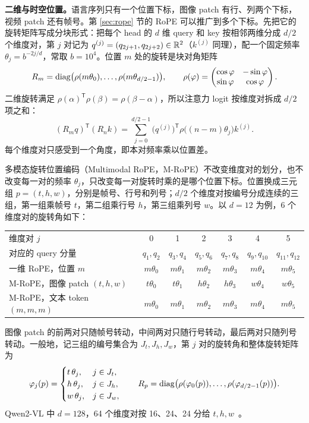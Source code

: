 \textbf{二维与时空位置。}语言序列只有一个位置下标，图像 patch 有行、列两个下标，视频 patch 还有帧号。第 \ref{sec:rope} 节的 RoPE 可以推广到多个下标。先把它的旋转矩阵写成分块形式：把每个 head 的 \(d\) 维 query 和 key 按相邻两维分成 \(d/2\) 个维度对，第 \(j\) 对记为 \(q^{(j)}=(q_{2j+1},q_{2j+2})\in\mathbb{R}^2\)（\(k^{(j)}\) 同理），配一个固定频率 \(\theta_j=b^{-2j/d}\)，常取 \(b=10^4\)。位置 \(m\) 处的旋转是块对角矩阵
\begin{equation}
 R_m=\operatorname{diag}\bigl(\rho(m\theta_0),\ldots,\rho(m\theta_{d/2-1})\bigr),
 \qquad
 \rho(\varphi)=\begin{pmatrix}\cos\varphi&-\sin\varphi\\ \sin\varphi&\cos\varphi\end{pmatrix}.
\end{equation}
二维旋转满足 \(\rho(\alpha)^\mathsf T\rho(\beta)=\rho(\beta-\alpha)\)，所以注意力 logit 按维度对拆成 \(d/2\) 项之和：
\begin{equation}
 (R_mq)^\mathsf T(R_nk)=\sum_{j=0}^{d/2-1}\bigl(q^{(j)}\bigr)^\mathsf T\rho\bigl((n-m)\theta_j\bigr)k^{(j)}.
 \label{eq:rope-pairs}
\end{equation}
每个维度对只感受到一个角度，即本对频率乘以位置差。

多模态旋转位置编码（Multimodal RoPE，M-RoPE）不改变维度对的划分，也不改变每一对的频率 \(\theta_j\)，只改变每一对旋转时乘的是哪个位置下标。位置换成三元组 \(p=(t,h,w)\)，分别是帧号、行号和列号；\(d/2\) 个维度对按编号分成连续的三组，第一组乘帧号 \(t\)，第二组乘行号 \(h\)，第三组乘列号 \(w\)。以 \(d=12\) 为例，6 个维度对的旋转角如下：
\begin{center}\small
\begin{tabular}{lcccccc}
\toprule
维度对 \(j\) & 0 & 1 & 2 & 3 & 4 & 5\\
对应的 query 分量 & \(q_1,q_2\) & \(q_3,q_4\) & \(q_5,q_6\) & \(q_7,q_8\) & \(q_9,q_{10}\) & \(q_{11},q_{12}\)\\
\midrule
一维 RoPE，位置 \(m\) & \(m\theta_0\) & \(m\theta_1\) & \(m\theta_2\) & \(m\theta_3\) & \(m\theta_4\) & \(m\theta_5\)\\
M-RoPE，图像 patch \((t,h,w)\) & \(t\theta_0\) & \(t\theta_1\) & \(h\theta_2\) & \(h\theta_3\) & \(w\theta_4\) & \(w\theta_5\)\\
M-RoPE，文本 token \((m,m,m)\) & \(m\theta_0\) & \(m\theta_1\) & \(m\theta_2\) & \(m\theta_3\) & \(m\theta_4\) & \(m\theta_5\)\\
\bottomrule
\end{tabular}
\end{center}
图像 patch 的前两对只随帧号转动，中间两对只随行号转动，最后两对只随列号转动。一般地，记三组的编号集合为 \(J_t,J_h,J_w\)，第 \(j\) 对的旋转角和整体旋转矩阵为
\begin{equation}
 \varphi_j(p)=
 \begin{cases}
 t\,\theta_j, & j\in J_t,\\
 h\,\theta_j, & j\in J_h,\\
 w\,\theta_j, & j\in J_w,
 \end{cases}
 \qquad
 R_p=\operatorname{diag}\bigl(\rho(\varphi_0(p)),\ldots,\rho(\varphi_{d/2-1}(p))\bigr).
 \label{eq:mrope}
\end{equation}
Qwen2-VL 中 \(d=128\)，64 个维度对按 16、24、24 分给 \(t,h,w\)~\cite{wang2024qwen2vl}。

